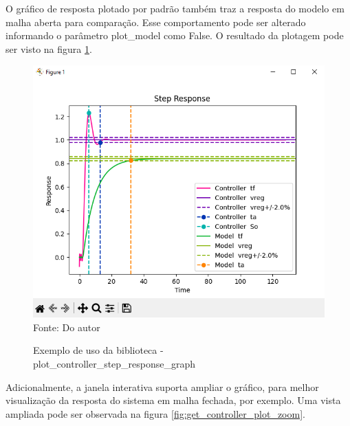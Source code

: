 O gráfico de resposta plotado por padrão também traz a resposta do modelo em malha aberta para comparação.
Esse comportamento pode ser alterado informando o parâmetro plot\_model como False.
O resultado da plotagem pode ser visto na figura \ref{fig:get_controller_plot}.

\begin{figure}[H]
    \centering
    \caption{Exemplo de uso da biblioteca - plot\_controller\_step\_response\_graph}
    \includegraphics[scale=0.6]{figuras/get_controller_plot}
    \label{fig:get_controller_plot}
    \\
    \vspace{0cm}\hspace{0cm}\small{Fonte: Do autor}
\end{figure}

Adicionalmente, a janela interativa suporta ampliar o gráfico, para melhor visualização da resposta do sistema em
malha fechada, por exemplo.
Uma vista ampliada pode ser observada na figura \ref{fig:get_controller_plot_zoom}.

